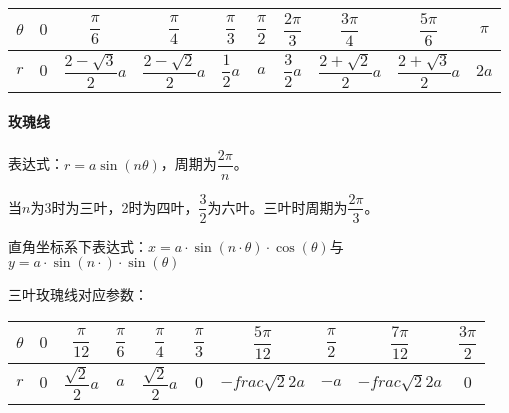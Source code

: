 \documentclass[UTF8, 12pt]{ctexart}
\begin{document}
        \begin{tabular}{|c|c|c|c|c|c|c|c|c|c|}
            \hline
            $\theta$ & $0$ & $\dfrac{\pi}{6}$         & $\dfrac{\pi}{4}$         & $\dfrac{\pi}{3}$ & $\dfrac{\pi}{2}$ & $\dfrac{2\pi}{3}$ & $\dfrac{3\pi}{4}$        & $\dfrac{5\pi}{6}$        & $\pi$ \\ \hline
            $r$      & $0$ & $\dfrac{2-\sqrt{3}}{2}a$ & $\dfrac{2-\sqrt{2}}{2}a$ & $\dfrac{1}{2}a$  & $a$             & $\dfrac{3}{2}a$   & $\dfrac{2+\sqrt{2}}{2}a$ & $\dfrac{2+\sqrt{3}}{2}a$ & $2a$  \\
            \hline
        \end{tabular}

        \paragraph{玫瑰线} \leavevmode \medskip

        \begin{minipage}{0.55\linewidth}
            表达式：$r=a\sin(n\theta)$，周期为$\dfrac{2\pi}{n}$。

            当$n$为3时为三叶，2时为四叶，$\dfrac{3}{2}$为六叶。三叶时周期为$\dfrac{2\pi}{3}$。

            直角坐标系下表达式：$x=a\cdot\sin(n\cdot\theta)\cdot\cos(\theta)$与$y=a\cdot\sin(n\cdot)\cdot\sin(\theta)$
        \end{minipage}
        \hfill
        \begin{minipage}{0.35\linewidth}
        \end{minipage}

        三叶玫瑰线对应参数： \leavevmode \medskip

        \begin{tabular}{|c|c|c|c|c|c|c|c|c|c|}
            \hline
            $\theta$ & $0$ & $\dfrac{\pi}{12}$      & $\dfrac{\pi}{6}$ & $\dfrac{\pi}{4}$       & $\dfrac{\pi}{3}$ & $\dfrac{5\pi}{12}$     & $\dfrac{\pi}{2}$ & $\dfrac{7\pi}{12}$     & $\dfrac{3\pi}{2}$ \\ \hline
            $r$      & $0$ & $\dfrac{\sqrt{2}}{2}a$ & $a$             & $\dfrac{\sqrt{2}}{2}a$ & $0$             & $-frac{\sqrt{2}}{2}a$ & $-a$            & $-frac{\sqrt{2}}{2}a$ & $0$              \\
            \hline
        \end{tabular}
\end{document}
